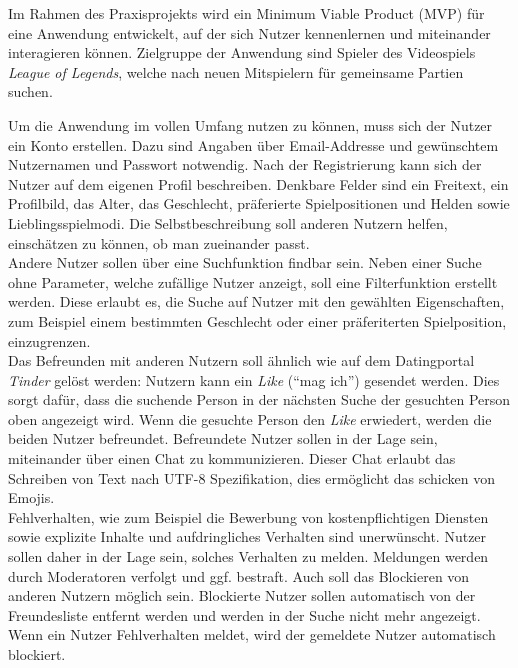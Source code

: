 Im Rahmen des Praxisprojekts wird ein Minimum Viable Product
(\gls{MVP}) 
für eine Anwendung entwickelt, auf der sich Nutzer kennenlernen und miteinander interagieren können. Zielgruppe der Anwendung sind Spieler des Videospiels \textit{League of Legends}, welche nach neuen Mitspielern für gemeinsame Partien suchen.

Um die Anwendung im vollen Umfang nutzen zu können, muss sich der Nutzer ein Konto erstellen.
Dazu sind Angaben über Email-Addresse und gewünschtem Nutzernamen und Passwort notwendig.
Nach der Registrierung kann sich der Nutzer auf dem eigenen Profil beschreiben.
Denkbare Felder sind ein Freitext, ein Profilbild, das Alter, das Geschlecht, präferierte Spielpositionen und Helden sowie Lieblingsspielmodi.
Die Selbstbeschreibung soll anderen Nutzern helfen, einschätzen zu können, ob man zueinander passt.\\

Andere Nutzer sollen über eine Suchfunktion findbar sein.
Neben einer Suche ohne Parameter, welche zufällige Nutzer anzeigt, soll eine Filterfunktion erstellt werden.
Diese erlaubt es, die Suche auf Nutzer mit den gewählten Eigenschaften, zum Beispiel einem bestimmten Geschlecht oder einer präferiterten Spielposition, einzugrenzen. \\

Das Befreunden mit anderen Nutzern soll ähnlich wie auf dem Datingportal \textit{Tinder} gelöst werden: Nutzern kann ein \textit{Like} (\enquote{mag ich}) gesendet werden.
Dies sorgt dafür, dass die suchende Person in der nächsten Suche der gesuchten Person oben angezeigt wird.
Wenn die gesuchte Person den \textit{Like} erwiedert, werden die beiden Nutzer befreundet.
Befreundete Nutzer sollen in der Lage sein, miteinander über einen Chat zu kommunizieren.
Dieser Chat erlaubt das Schreiben von Text nach \gls{UTF-8} Spezifikation,
dies ermöglicht das schicken von Emojis.\\

Fehlverhalten, wie zum Beispiel die Bewerbung von kostenpflichtigen Diensten sowie explizite Inhalte und aufdringliches Verhalten sind unerwünscht.
Nutzer sollen daher in der Lage sein, solches Verhalten zu melden.
Meldungen werden durch Moderatoren verfolgt und ggf. bestraft.
Auch soll das Blockieren von anderen Nutzern möglich sein.
Blockierte Nutzer sollen automatisch von der Freundesliste entfernt werden und werden in der Suche nicht mehr angezeigt.
Wenn ein Nutzer Fehlverhalten meldet, wird der gemeldete Nutzer automatisch blockiert.\\


